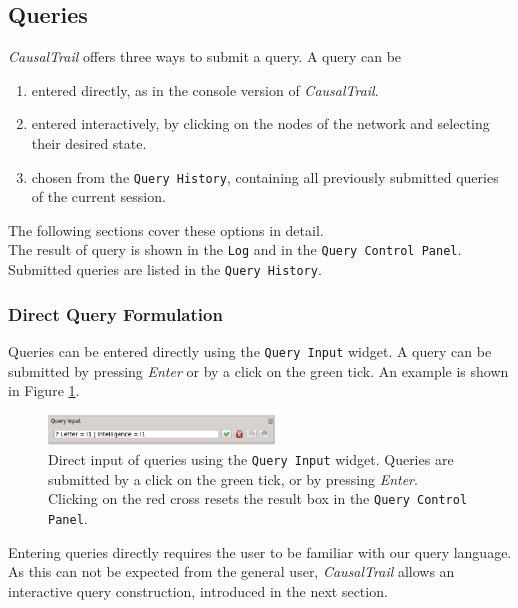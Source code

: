 \subsection{Queries}
\label{subsection:queryFormulation}
\textit{CausalTrail} offers three ways to submit a query. A query can be
\begin{enumerate}
  \item entered directly, as in the console version of \textit{CausalTrail}.
  \item entered interactively, by clicking on the nodes of the network and selecting their desired state.
  \item chosen from the \texttt{Query History}, containing all previously submitted queries of the current session.
\end{enumerate}
The following sections cover these options in detail.  
\bigskip
\\The result of query is shown in the \texttt{Log} and in the \texttt{Query Control Panel}. Submitted queries are listed in the 
\texttt{Query History}.

\subsubsection{Direct Query Formulation}
Queries can be entered directly using the \texttt{Query Input} widget. A query can be submitted by pressing \textit{Enter} or by a click on the green tick.
An example is shown in Figure \ref{figure:queryDirect}.
\begin{figure}[H]
 \begin{center}
  \includegraphics[width=6cm]{pic/queryInputDirect.eps}
  \caption{Direct input of queries using the \texttt{Query Input} widget. Queries are submitted by a click on the green tick, or by pressing \textit{Enter}. Clicking on the red cross resets the result box in the \texttt{Query Control Panel}.}
  \label{figure:queryDirect}
 \end{center}
\end{figure}
\noindent
Entering queries directly requires the user to be familiar with our query language. As this can not be expected from the general user, \textit{CausalTrail}
allows an interactive query construction, introduced in the next section.

